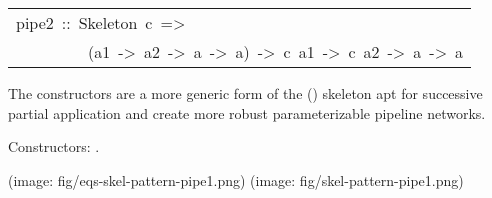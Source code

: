 \begin{haddockdesc}
\item[\begin{tabular}{@{}l}
pipe2\ ::\ Skeleton\ c\ =>\\\ \ \ \ \ \ \ \ \ (a1\ ->\ a2\ ->\ a\ ->\ a)\ ->\ c\ a1\ ->\ c\ a2\ ->\ a\ ->\ a
\end{tabular}]\haddockbegindoc
The  constructors are a more generic form of the \haddockid{=<<=}
 () skeleton apt for successive partial application and create
 more robust parameterizable pipeline networks.\par
Constructors: .\par
(image: fig/eqs-skel-pattern-pipe1.png)
 (image: fig/skel-pattern-pipe1.png)\par

\end{haddockdesc}